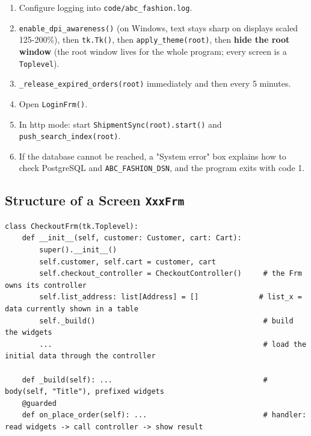 \begin{enumerate}
\def\labelenumi{\arabic{enumi}.}
\tightlist
\item
  Configure logging into \texttt{code/\allowbreak{}abc\_\allowbreak{}fashion.\allowbreak{}log}.
\item
  \texttt{enable\_\allowbreak{}dpi\_\allowbreak{}awareness(\allowbreak{})} (on Windows, text stays sharp on
  displays scaled 125-200\%), then \texttt{tk.\allowbreak{}Tk(\allowbreak{})}, then
  \texttt{apply\_\allowbreak{}theme(\allowbreak{}root)}, then \textbf{hide the root window} (the
  root window lives for the whole program; every screen is a
  \texttt{Toplevel}).
\item
  \texttt{\_\allowbreak{}release\_\allowbreak{}expired\_\allowbreak{}orders(\allowbreak{}root)} immediately and then every 5
  minutes.
\item
  Open \texttt{LoginFrm(\allowbreak{})}.
\item
  In http mode: start \texttt{ShipmentSync(\allowbreak{}root).\allowbreak{}start(\allowbreak{})} and
  \texttt{push\_\allowbreak{}search\_\allowbreak{}index(\allowbreak{}root)}.
\item
  If the database cannot be reached, a "System error" box explains how
  to check PostgreSQL and \texttt{ABC\_\allowbreak{}FASHION\_\allowbreak{}DSN}, and the program
  exits with code 1.
\end{enumerate}

\hypertarget{structure-of-a-screen-xxxfrm}{%
\subsection{\texorpdfstring{Structure of a Screen
\texttt{XxxFrm}}{Structure of a Screen XxxFrm}}\label{structure-of-a-screen-xxxfrm}}

\begin{lstlisting}[numbers=none]
class CheckoutFrm(tk.Toplevel):
    def __init__(self, customer: Customer, cart: Cart):
        super().__init__()
        self.customer, self.cart = customer, cart
        self.checkout_controller = CheckoutController()     # the Frm owns its controller
        self.list_address: list[Address] = []              # list_x = data currently shown in a table
        self._build()                                       # build the widgets
        ...                                                 # load the initial data through the controller

    def _build(self): ...                                   # body(self, "Title"), prefixed widgets
    @guarded
    def on_place_order(self): ...                           # handler: read widgets -> call controller -> show result
\end{lstlisting}

